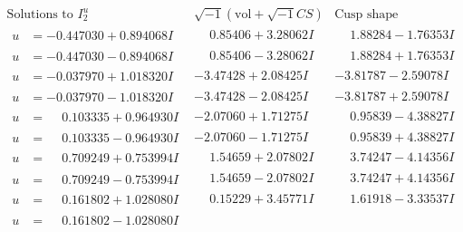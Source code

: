 \documentclass[1p]{elsarticle_modified}
\theoremstyle{definition}
\newcommand{\I}{\sqrt{-1}}
\begin{document}
$$\begin{array}{c|c|c}  
\text{Solutions to }I^u_{2}& \I (\text{vol} + \sqrt{-1}CS) & \text{Cusp shape}\\
 \hline 
\begin{aligned}
u &= -0.447030 + 0.894068 I\end{aligned}
 & \phantom{-}0.85406 + 3.28062 I & \phantom{-}1.88284 - 1.76353 I \\ \hline\begin{aligned}
u &= -0.447030 - 0.894068 I\end{aligned}
 & \phantom{-}0.85406 - 3.28062 I & \phantom{-}1.88284 + 1.76353 I \\ \hline\begin{aligned}
u &= -0.037970 + 1.018320 I\end{aligned}
 & -3.47428 + 2.08425 I & -3.81787 - 2.59078 I \\ \hline\begin{aligned}
u &= -0.037970 - 1.018320 I\end{aligned}
 & -3.47428 - 2.08425 I & -3.81787 + 2.59078 I \\ \hline\begin{aligned}
u &= \phantom{-}0.103335 + 0.964930 I\end{aligned}
 & -2.07060 + 1.71275 I & \phantom{-}0.95839 - 4.38827 I \\ \hline\begin{aligned}
u &= \phantom{-}0.103335 - 0.964930 I\end{aligned}
 & -2.07060 - 1.71275 I & \phantom{-}0.95839 + 4.38827 I \\ \hline\begin{aligned}
u &= \phantom{-}0.709249 + 0.753994 I\end{aligned}
 & \phantom{-}1.54659 + 2.07802 I & \phantom{-}3.74247 - 4.14356 I \\ \hline\begin{aligned}
u &= \phantom{-}0.709249 - 0.753994 I\end{aligned}
 & \phantom{-}1.54659 - 2.07802 I & \phantom{-}3.74247 + 4.14356 I \\ \hline\begin{aligned}
u &= \phantom{-}0.161802 + 1.028080 I\end{aligned}
 & \phantom{-}0.15229 + 3.45771 I & \phantom{-}1.61918 - 3.33537 I \\ \hline\begin{aligned}
u &= \phantom{-}0.161802 - 1.028080 I\end{aligned}

\end{array}$$
\end{document}
